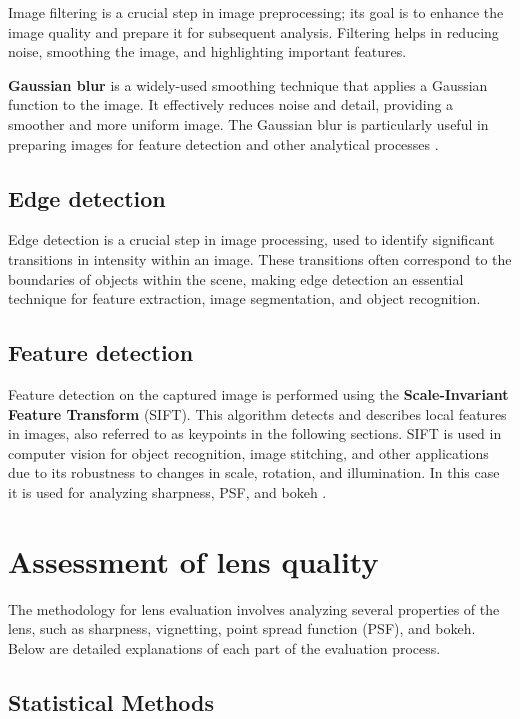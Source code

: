 Image filtering is a crucial step in image preprocessing; its goal is to enhance the image quality and prepare it for subsequent analysis. Filtering helps in reducing noise, smoothing the image, and highlighting important features.

\textbf{Gaussian blur} is a widely-used smoothing technique that applies a Gaussian function to the image. It effectively reduces noise and detail, providing a smoother and more uniform image. The Gaussian blur is particularly useful in preparing images for feature detection and other analytical processes \cite{gaussian}. 

\subsection{Edge detection}

Edge detection is a crucial step in image processing, used to identify significant transitions in intensity within an image. These transitions often correspond to the boundaries of objects within the scene, making edge detection an essential technique for feature extraction, image segmentation, and object recognition.

\subsection{Feature detection}
Feature detection on the captured image is performed using the \textbf{Scale-Invariant Feature Transform} (SIFT). This algorithm detects and describes local features in images, also referred to as keypoints in the following sections. SIFT is used in computer vision for object recognition, image stitching, and other applications due to its robustness to changes in scale, rotation, and illumination. In this case it is used for analyzing sharpness, PSF, and bokeh \cite{Sift}.

\section{Assessment of lens quality}

The methodology for lens evaluation involves analyzing several properties of the lens, such as sharpness, vignetting, point spread function (PSF), and bokeh. Below are detailed explanations of each part of the evaluation process.

\subsection{Statistical Methods}

